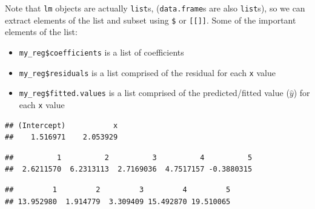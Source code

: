 \documentclass[]{book}
\newenvironment{Shaded}{\begin{snugshade}}{\end{snugshade}}
\newcommand{\DecValTok}[1]{\textcolor[rgb]{0.00,0.00,0.81}{#1}}
\newcommand{\CommentTok}[1]{\textcolor[rgb]{0.56,0.35,0.01}{\textit{#1}}}
\newcommand{\OperatorTok}[1]{\textcolor[rgb]{0.81,0.36,0.00}{\textbf{#1}}}
\newcommand{\NormalTok}[1]{#1}
\providecommand{\tightlist}{%
  \setlength{\itemsep}{0pt}\setlength{\parskip}{0pt}}
\theoremstyle{definition}
\theoremstyle{definition}
\theoremstyle{definition}
\theoremstyle{remark}
\begin{document}
Note that \texttt{lm} objects are actually \texttt{list}s,
(\texttt{data.frame}s are also \texttt{list}s), so we can extract
elements of the list and subset using \texttt{\$} or
\texttt{{[}{[}{]}{]}}. Some of the important elements of the list:

\begin{itemize}
\tightlist
\item
  \texttt{my\_reg\$coefficients} is a list of coefficients
\item
  \texttt{my\_reg\$residuals} is a list comprised of the residual for
  each \texttt{x} value
\item
  \texttt{my\_reg\$fitted.values} is a list comprised of the
  predicted/fitted value (\(\hat{y}\)) for each \texttt{x} value
\end{itemize}

\begin{Shaded}
\end{Shaded}

\begin{verbatim}
## (Intercept)           x 
##    1.516971    2.053929
\end{verbatim}

\begin{Shaded}
\end{Shaded}

\begin{verbatim}
##          1          2          3          4          5 
##  2.6211570  6.2313113  2.7169036  4.7517157 -0.3880315
\end{verbatim}

\begin{Shaded}
\end{Shaded}

\begin{verbatim}
##         1         2         3         4         5 
## 13.952980  1.914779  3.309409 15.492870 19.510065
\end{verbatim}
\end{document}

